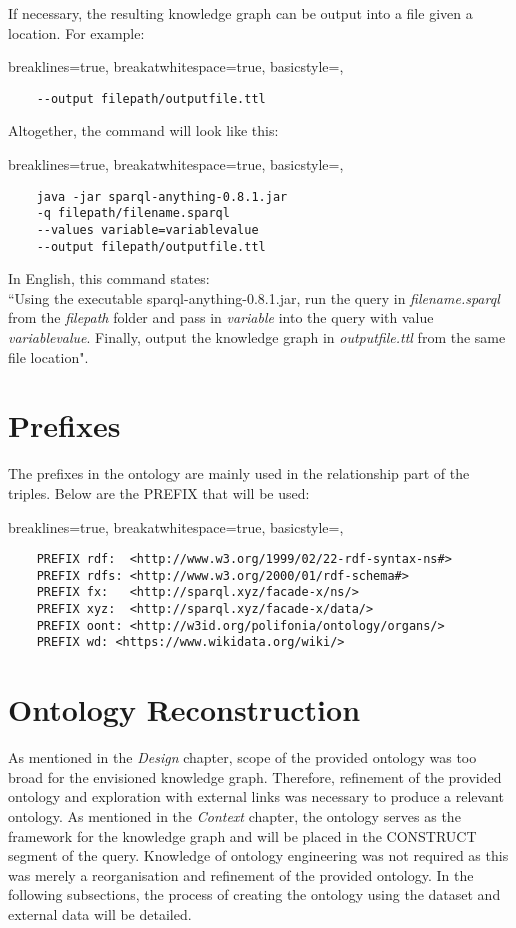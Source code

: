 \noindent If necessary, the resulting knowledge graph can be output into a file given a location. For example:

\lstset
{
    breaklines=true,
    breakatwhitespace=true,
    basicstyle=\linespread{1.5}\ttfamily,
}
\begin{lstlisting}
    --output filepath/outputfile.ttl
\end{lstlisting}

\noindent Altogether, the command will look like this:

\lstset
{
    breaklines=true,
    breakatwhitespace=true,
    basicstyle=\linespread{1.5}\ttfamily,
}
\begin{lstlisting}
    java -jar sparql-anything-0.8.1.jar
    -q filepath/filename.sparql 
    --values variable=variablevalue 
    --output filepath/outputfile.ttl
\end{lstlisting}

\noindent In English, this command states: \\
\hspace*{0.5cm} ``Using the executable sparql-anything-0.8.1.jar, run the query in \textit{filename.sparql} from the \textit{filepath} folder and pass in \textit{variable} into the query with value \textit{variablevalue}. Finally, output the knowledge graph in \textit{outputfile.ttl} from the same file location". 

\section{Prefixes}
\hspace*{0.5cm} The prefixes in the ontology are mainly used in the relationship part of the triples. Below are the PREFIX that will be used:

\lstset
{
    breaklines=true,
    breakatwhitespace=true,
    basicstyle=\linespread{1.5}\ttfamily,
}
\begin{lstlisting}
    PREFIX rdf:  <http://www.w3.org/1999/02/22-rdf-syntax-ns#>
    PREFIX rdfs: <http://www.w3.org/2000/01/rdf-schema#>
    PREFIX fx:   <http://sparql.xyz/facade-x/ns/>
    PREFIX xyz:  <http://sparql.xyz/facade-x/data/>
    PREFIX oont: <http://w3id.org/polifonia/ontology/organs/>
    PREFIX wd: <https://www.wikidata.org/wiki/> 
\end{lstlisting}

\section{Ontology Reconstruction}
\hspace*{0.5cm} As mentioned in the \textit{Design} chapter, scope of the provided ontology was too broad for the envisioned knowledge graph. Therefore, refinement of the provided ontology and exploration with external links was necessary to produce a relevant ontology. As mentioned in the \textit{Context} chapter, the ontology serves as the framework for the knowledge graph and will be placed in the CONSTRUCT segment of the query. Knowledge of ontology engineering was not required as this was merely a reorganisation and refinement of the provided ontology. In the following subsections, the process of creating the ontology using the dataset and external data will be detailed.

